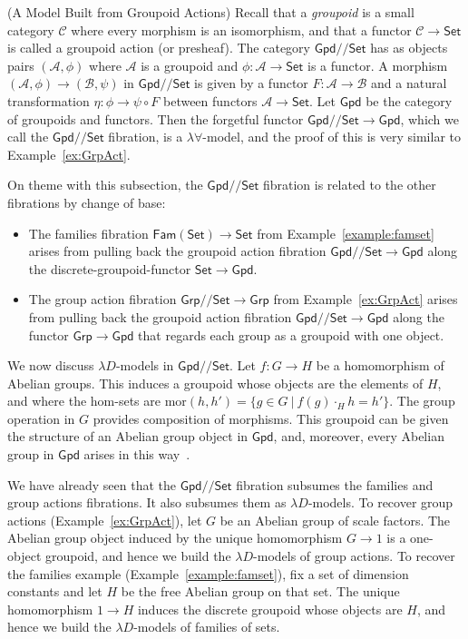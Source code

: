 \documentclass[a4paper,UKenglish]{lipics}
\theoremstyle{plain}
\newcommand{\msf}[1]{\mathsf{#1}} %
\newcommand{\Grp}{\msf{Grp}}
\newcommand{\Set}{\msf{Set}}
\newcommand{\Gpd}{\msf{Gpd}}
\newcommand{\Fam}[1]{\msf{Fam}(#1)}
\newcommand{\A}{\mathcal{A}}
\newcommand{\B}{\mathcal{B}}
\newcommand{\C}{\mathcal{C}}
\newcommand{\Lslice}[1]{#1/\!/\Set}
\newcommand{\GrpSet}{\Lslice{\Grp}}
\newcommand{\GpdSet}{\Lslice{\Gpd}}
\begin{document}
\begin{example}(A Model Built from Groupoid Actions)
\label{ex:presheaves}
Recall that a \emph{groupoid} is a small category $\C$ where every morphism is an isomorphism, and that a functor $\C\to\Set$ is called a groupoid action (or presheaf). The category $\GpdSet$ has as objects pairs $(\A,\phi)$ where $\A$ is a groupoid and $\phi:\A\to\Set$ is a functor. A morphism $(\A,\phi) \rightarrow (\B,\psi)$ in $\GpdSet$ is given by a functor $F:\A\rightarrow \B$ and a natural transformation $\eta:\phi \to \psi \circ F$ between functors $\A \to\Set$. Let $\Gpd$ be the category of groupoids and functors. Then the forgetful functor $\GpdSet\to \Gpd$, which we call the $\GpdSet$ fibration, is a $\lambda \forall$-model, and the proof of this is very similar to Example~\ref{ex:GrpAct}.

On theme with this subsection, the $\GpdSet$ fibration is related to the other fibrations by change of base:
\begin{itemize}
\item The families fibration $\Fam\Set\to\Set$ from Example~\ref{example:famset} arises from pulling back the groupoid action fibration $\GpdSet\to\Gpd$ along the discrete-groupoid-functor $\Set\to\Gpd$.

\item The group action fibration $\GrpSet\to\Grp$ from Example~\ref{ex:GrpAct} arises from pulling back the groupoid action fibration $\GpdSet\to\Gpd$ along the functor $\Grp\to\Gpd$ that regards each group as a groupoid with one object.
\end{itemize}

We now discuss $\lambda D$-models in $\GpdSet$. Let $f:G\to H$ be a homomorphism of Abelian groups. This induces a groupoid whose objects are the elements of $H$, and where the hom-sets are $\mathrm{mor}(h,h')=\{g\in G~|~f(g)\cdot_Hh=h'\}$. The group operation in $G$ provides composition of morphisms. This groupoid can be given the structure of an Abelian group object in $\Gpd$, and, moreover, every Abelian group in $\Gpd$ arises in this way~\cite{brown-spencer}.

We have already seen that the $\GpdSet$ fibration subsumes the families and group actions fibrations. It also subsumes them as $\lambda D$-models. To recover group actions (Example~\ref{ex:GrpAct}), let $G$ be an Abelian group of scale factors. The Abelian group object induced by the unique homomorphism $G\to 1$ is a one-object groupoid, and hence we build the $\lambda D$-models of group actions. To recover the families example (Example~\ref{example:famset}), fix a set of dimension constants and let $H$ be the free Abelian group on that set. The unique homomorphism $1\to H$ induces the discrete groupoid whose objects are $H$, and hence we build the $\lambda D$-models of families of sets.
\end{example}
\end{document}
